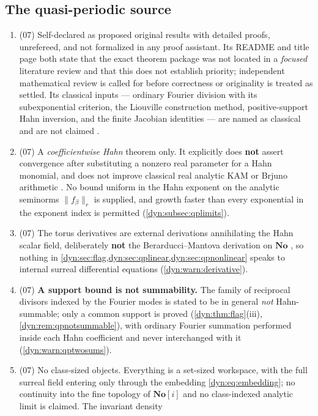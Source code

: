 \documentclass[11pt,letterpaper]{article}
\theoremstyle{definition}
\theoremstyle{remark}
\newcommand{\No}{\mathbf{No}}
\numberwithin{equation}{section}
\begin{document}
\subsection{The quasi-periodic source}
\begin{enumerate}[label=\textbf{N\arabic*.},leftmargin=3.2em,start=71]
\item (07) Self-declared as proposed original results with detailed proofs,
unrefereed, and not formalized in any proof assistant. Its README and title
page both state that the exact theorem package was not located in a
\emph{focused} literature review and that this does not establish priority;
independent mathematical review is called for before correctness or
originality is treated as settled. Its classical inputs --- ordinary
Fourier division with its subexponential criterion, the Liouville
construction method, positive-support Hahn inversion, and the finite
Jacobian identities --- are named as classical and are not claimed
\cite{Bounemoura,Kamienski,Neumann,Poonen}.
\item (07) A \emph{coefficientwise Hahn} theorem only. It explicitly does
\textbf{not} assert convergence after substituting a nonzero real parameter
for a Hahn monomial, and does not improve classical real analytic KAM or
Brjuno arithmetic \cite{Bounemoura,Chevallier}. No bound uniform in the
Hahn exponent on the analytic seminorms $\|f_\beta\|_{r}$ is supplied, and
growth faster than every exponential in the exponent index is permitted
(\cref{dyn:subsec:qplimits}).
\item (07) The torus derivatives are external derivations annihilating the
Hahn scalar field, deliberately \textbf{not} the Berarducci--Mantova
derivation on $\No$ \cite{BM}, so nothing in
\cref{dyn:sec:flag,dyn:sec:qplinear,dyn:sec:qpnonlinear} speaks to internal
surreal differential equations (\cref{dyn:warn:derivative}).
\item (07) \textbf{A support bound is not summability.} The family of
reciprocal divisors indexed by the Fourier modes is stated to be in general
\emph{not} Hahn-summable; only a common support is proved
(\cref{dyn:thm:flag}(iii), \cref{dyn:rem:qpnotsummable}), with ordinary
Fourier summation performed inside each Hahn coefficient and never
interchanged with it (\cref{dyn:warn:qptwosums}).
\item (07) No class-sized objects. Everything is a set-sized workspace,
with the full surreal field entering only through the embedding
\eqref{dyn:eq:embedding}; no continuity into the fine topology of $\No[i]$
and no class-indexed analytic limit is claimed. The invariant density

\end{enumerate}
\end{document}
